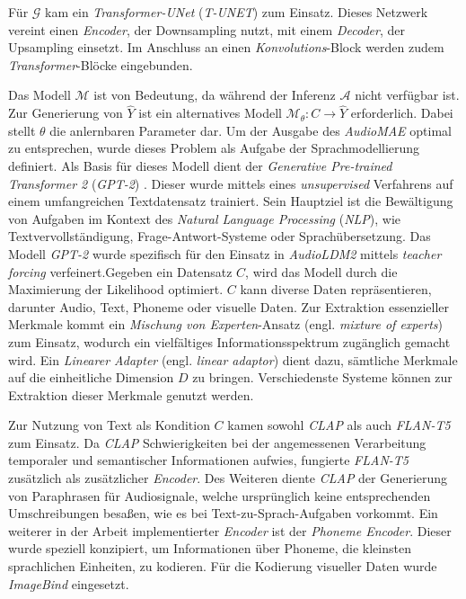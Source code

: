 \documentclass[
  a4paper,  %
  twoside,  %
  bibliography=totoc,
  headsepline,
  cleardoublepage=empty,
  parskip=half,
  draft=false
]{scrbook}
\begin{document}
{Für $\mathcal{G}$ kam ein \emph{Transformer-UNet} (\emph{T-UNET}) zum Einsatz. Dieses Netzwerk vereint einen \emph{Encoder}, der Downsampling nutzt, mit einem \emph{Decoder}, der Upsampling einsetzt. Im Anschluss an einen \emph{Konvolutions}-Block werden zudem \emph{Transformer}-Blöcke eingebunden. \cite{liu_audioldm2_2023}

Das Modell $\mathcal{M}$ ist von Bedeutung, da während der Inferenz $\mathcal{A}$ nicht verfügbar ist. Zur Generierung von $\hat{Y}$ ist ein alternatives Modell $\mathcal{M}_\theta: C \rightarrow \hat{Y}$ erforderlich. Dabei stellt $\theta$ die anlernbaren Parameter dar. Um der Ausgabe des \emph{AudioMAE} optimal zu entsprechen, wurde dieses Problem als Aufgabe der Sprachmodellierung definiert. Als Basis für dieses Modell dient der \emph{Generative Pre-trained Transformer 2} (\emph{GPT-2}) \cite{alec_radford_jeff_wu_rewon_child_david_luan_dario_amodei_ilya_sutskever_language_2019}. Dieser wurde mittels eines \emph{unsupervised} Verfahrens auf einem umfangreichen Textdatensatz trainiert. Sein Hauptziel ist die Bewältigung von Aufgaben im Kontext des \emph{Natural Language Processing} (\emph{NLP}), wie Textvervollständigung, Frage-Antwort-Systeme oder Sprachübersetzung. Das Modell \emph{GPT-2} wurde spezifisch für den Einsatz in \emph{AudioLDM2} mittels \emph{teacher forcing} \cite{kolen_field_2001} verfeinert.Gegeben ein Datensatz $C$, wird das Modell durch die Maximierung der Likelihood optimiert. $C$ kann diverse Daten repräsentieren, darunter Audio, Text, Phoneme oder visuelle Daten. Zur Extraktion essenzieller Merkmale kommt ein \emph{Mischung von Experten}-Ansatz (engl. \emph{mixture of experts}) \cite{masoudnia_mixture_2014} zum Einsatz, wodurch ein vielfältiges Informationsspektrum zugänglich gemacht wird. Ein \emph{Linearer Adapter} (engl. \emph{linear adaptor}) dient dazu, sämtliche Merkmale auf die einheitliche Dimension $D$ zu bringen. Verschiedenste Systeme können zur Extraktion dieser Merkmale genutzt werden. \cite{liu_audioldm2_2023}

Zur Nutzung von Text als Kondition $C$ kamen sowohl \emph{CLAP} \cite{wu_large-scale_2023} als auch \emph{FLAN-T5} \cite{chung_scaling_2022} zum Einsatz. Da \emph{CLAP} Schwierigkeiten bei der angemessenen Verarbeitung temporaler und semantischer Informationen aufwies, fungierte \emph{FLAN-T5} zusätzlich als zusätzlicher \emph{Encoder}. Des Weiteren diente \emph{CLAP} der Generierung von Paraphrasen für Audiosignale, welche ursprünglich keine entsprechenden Umschreibungen besaßen, wie es bei Text-zu-Sprach-Aufgaben vorkommt. Ein weiterer in der Arbeit implementierter \emph{Encoder} ist der \emph{Phoneme Encoder}. Dieser wurde speziell konzipiert, um Informationen über Phoneme, die kleinsten sprachlichen Einheiten, zu kodieren. Für die Kodierung visueller Daten wurde \emph{ImageBind} \cite{girdhar_imagebind_2023} eingesetzt. \cite{liu_audioldm2_2023}

}
\end{document}
